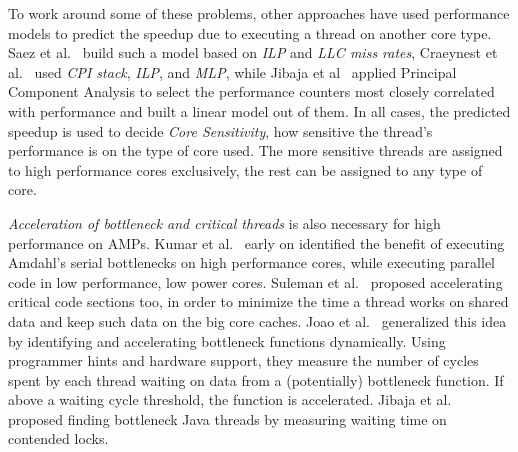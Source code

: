 To work around some of these problems, other approaches have used performance models to predict the speedup due to executing a thread on another core type. Saez et al.~\cite{saez2012leveraging} build such a model based on \emph{ILP} and \emph{LLC miss rates}, Craeynest et al.~\cite{van2012scheduling} used \emph{CPI stack}, \emph{ILP}, and \emph{MLP}, while Jibaja et al~\cite{jibaja2016portable} applied Principal Component Analysis to select the performance counters most closely correlated with performance and built a linear model out of them. In all cases, the predicted speedup is used to decide \emph{Core Sensitivity}, how sensitive the thread's performance is on the type of core used. The more sensitive threads are assigned to high performance cores exclusively, the rest can be assigned to any type of core.


\emph{Acceleration of bottleneck and critical threads} is also necessary for high performance on AMPs. Kumar et al.~\cite{Kumar:2005:HCM:1100859.1100890} early on identified the benefit of executing Amdahl's serial bottlenecks on high performance cores, while executing parallel code in low performance, low power cores. Suleman et al.~\cite{suleman2009accelerating} proposed accelerating critical code sections too, in order to minimize the time a thread works on shared data and keep such data on the big core caches. Joao et al.~\cite{joao2012bottleneck,joao2013utility} generalized this idea by identifying and accelerating bottleneck functions dynamically. Using programmer hints and hardware support, they measure the number of cycles spent by each thread waiting on data from a (potentially) bottleneck function. If above a waiting cycle threshold, the function is accelerated. Jibaja et al.~\cite{jibaja2016portable} proposed finding bottleneck Java threads by measuring waiting time on contended locks.

